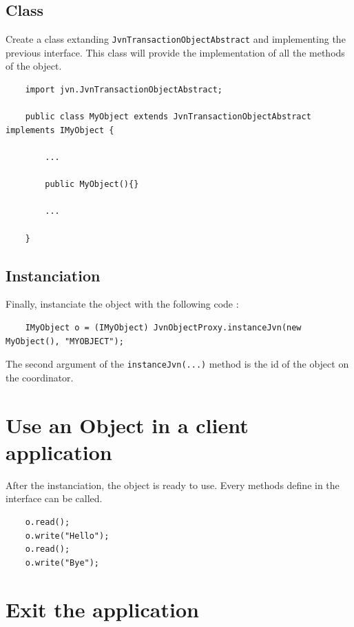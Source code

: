 \documentclass{article}
\begin{document}
\subsection{Class}

Create a class extanding \texttt{JvnTransactionObjectAbstract} and implementing the previous interface. This class will provide the implementation of all the methods of the object. \\

\noindent
\begin{verbatim}
    import jvn.JvnTransactionObjectAbstract; 

    public class MyObject extends JvnTransactionObjectAbstract implements IMyObject { 
	
        ...
        
        public MyObject(){}

        ...
	 
    }
\end{verbatim}

\subsection{Instanciation}

Finally, instanciate the object with the following code : \\

\noindent
\begin{verbatim}
    IMyObject o = (IMyObject) JvnObjectProxy.instanceJvn(new MyObject(), "MYOBJECT");
\end{verbatim}
\vspace{0.3cm}

\noindent The second argument of the \texttt{instanceJvn(...)} method is the id of the object on the coordinator.

\section{Use an Object in a client application}

After the instanciation, the object is ready to use. Every methods define in the interface can be called. \\

\noindent
\begin{verbatim}
    o.read();
    o.write("Hello");
    o.read();
    o.write("Bye");
\end{verbatim}

\section{Exit the application}
\end{document}
